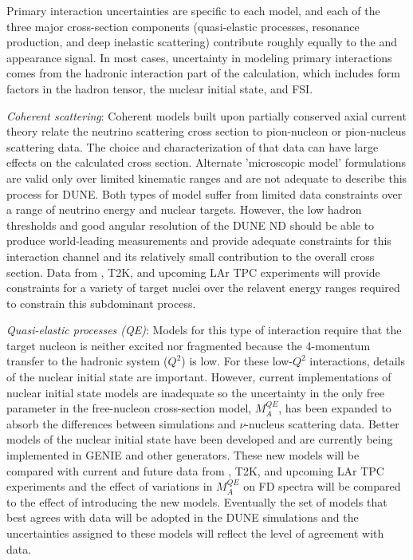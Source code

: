 Primary interaction uncertainties are specific to each model, and each of the three major
cross-section components (quasi-elastic processes, resonance production, and deep inelastic scattering)
contribute roughly equally to the \nue and \anue
appearance signal. In most cases, uncertainty in modeling primary interactions comes from the
hadronic interaction part of the calculation, which includes form factors in the hadron tensor,
the nuclear initial state, and FSI. 

  \emph{Coherent scattering}: Coherent models built upon partially conserved axial current
  theory relate the neutrino scattering 
  cross section to pion-nucleon or pion-nucleus scattering data. The choice and characterization
  of that data can have large effects on the calculated cross section. Alternate 'microscopic model' 
  formulations are valid only over limited kinematic ranges and are not adequate to describe this process 
  for DUNE. Both types of model suffer from limited data constraints over a range of neutrino energy
  and nuclear targets. 
  However, the low hadron thresholds and good angular resolution of the DUNE ND should be able
  to produce world-leading measurements and provide adequate constraints for this interaction channel and 
  its relatively small contribution to the overall cross section. Data from , T2K, and
  upcoming LAr TPC experiments will provide constraints for a variety of target nuclei over the
  relavent energy ranges required to constrain this subdominant process.

  \emph{Quasi-elastic processes (QE)}: Models for this type of interaction require that the target nucleon 
  is neither excited nor fragmented because the 4-momentum transfer to the hadronic system ($Q^{2}$) is low.
  For these low-$Q^{2}$ interactions, details of the nuclear initial state are important. However,
  current implementations of nuclear initial state models are inadequate so the uncertainty in the only
  free parameter in the free-nucleon cross-section model, $M_{A}^{QE}$, has been expanded to absorb the
  differences between simulations and $\nu$-nucleus scattering data. Better models of the nuclear
  initial state have been developed
  and are currently being implemented in GENIE and other generators. These new models will be compared with current 
  and future data from \minerva, T2K, and upcoming LAr TPC experiments and the effect of variations in $M_{A}^{QE}$
  on FD spectra will be compared to the effect of introducing the new models.
  Eventually the set of models that best agrees with data will be adopted in the DUNE simulations and
  the uncertainties assigned to these models will reflect the level of agreement with data.

